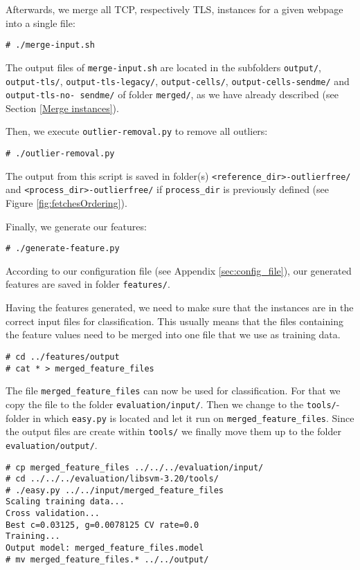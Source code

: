 Afterwards, we merge all \ac{TCP}, respectively \ac{TLS}, instances for a given webpage into a single file:
\begin{verbatim}
# ./merge-input.sh
\end{verbatim}
The output files of \texttt{merge-input.sh} are located in the subfolders \texttt{output/}, \texttt{output-tls/}, \texttt{output-tls-legacy/}, \texttt{output-cells/}, \texttt{output-cells-sendme/} and \texttt{output-tls-no- sendme/} of folder \texttt{merged/}, as we have already described (see Section \ref{Merge instances}).

Then, we execute \texttt{outlier-removal.py} to remove all outliers: 
\begin{verbatim}
# ./outlier-removal.py
\end{verbatim}
The output from this script is saved in folder(s) \texttt{<reference\_dir>-outlierfree/} and \texttt{<process\_dir>-outlierfree/} if \texttt{process\_dir} is previously defined (see Figure \ref{fig:fetchesOrdering}).

Finally, we generate our features:
\begin{verbatim}
# ./generate-feature.py
\end{verbatim}
According to our configuration file (see Appendix \ref{sec:config_file}), our generated features are saved in folder \texttt{features/}.

Having the features generated, we need to make sure that the instances are in the correct input files for classification. This usually means that the files containing the feature values need to be merged into one file that we use as training data. 

\begin{verbatim}
# cd ../features/output
# cat * > merged_feature_files
\end{verbatim}

The file \texttt{merged\_feature\_files} can now be used for classification. For that we copy the file to the folder \texttt{evaluation/input/}. Then we change to the \texttt{tools/}-folder in which \texttt{easy.py} is located and let it run on \texttt{merged\_feature\_files}. Since the output files are create within \texttt{tools/} we finally move them up to the folder \texttt{evaluation/output/}.

\begin{verbatim}
# cp merged_feature_files ../../../evaluation/input/
# cd ../../../evaluation/libsvm-3.20/tools/
# ./easy.py ../../input/merged_feature_files 
Scaling training data...
Cross validation...
Best c=0.03125, g=0.0078125 CV rate=0.0
Training...
Output model: merged_feature_files.model
# mv merged_feature_files.* ../../output/
\end{verbatim}

